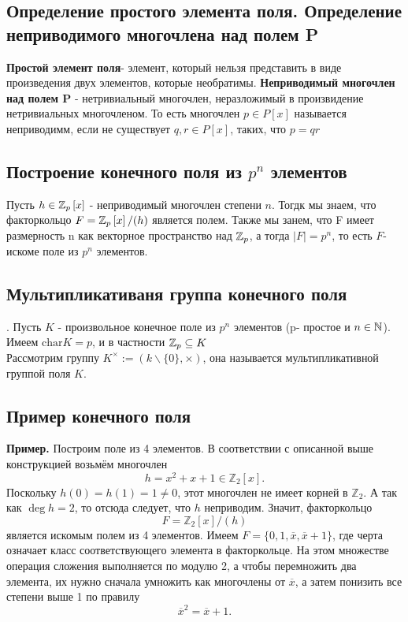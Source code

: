 \subsection{Определение простого элемента поля. Определение неприводимого многочлена над полем P}
\textbf{Простой элемент поля}- элемент, который  нельзя представить в виде произведения двух элементов, которые необратимы.
\textbf{Неприводимый многочлен над полем P} - нетривиальный многочлен, неразложимый в произвидение нетривиальных многочленом. То есть многочлен $p\in P\left[x\right]$ называется неприводимм, если не существует $q,r\in P\left[x\right]$, таких, что $p=qr$
\subsection{Построение конечного поля из $p^n$ элементов}
Пусть $h\in\mathbb{Z}_p\left[x\right]$ - неприводимый многочлен степени $n$. Тогдк мы знаем, что факторкольцо $F = \mathbb{Z}_p\left[x\right]/(h)$ является полем. Также мы занем, что F имеет размерность n как векторное пространство над $\mathbb{Z}_p$, а тогда $|F| = p^n$, то есть $F$- искоме поле из $p^n$ элементов. 
\subsection{Мультипликативаня группа конечного поля}.
Пусть $K$ - произвольное конечное поле из $p^n$ элементов (p- простое и $n\in\mathbb{N}$). Имеем $\text{char} K = p$, и в частности $\mathbb{Z}_p\subseteq K$\\
Рассмотрим группу $K^{\times} := (k\backslash\{0\}, \times)$, она называется мультипликативной группой поля $K$.
\subsection{Пример конечного поля}
\textbf{Пример.} Построим поле из 4 элементов. В соответствии с описанной выше конструкцией возьмём многочлен 
\[
h = x^2 + x + 1 \in \mathbb{Z}_2[x].
\]
Поскольку \( h(0) = h(1) = 1 \neq 0 \), этот многочлен не имеет корней в \(\mathbb{Z}_2\). А так как \(\deg h = 2\), то отсюда следует, что \( h \) неприводим. Значит, факторкольцо 
\[
F = \mathbb{Z}_2[x]/(h)
\]
является искомым полем из 4 элементов. Имеем \( F = \{0, 1, \overline{x}, \overline{x} + 1\} \), где черта означает класс соответствующего элемента в факторкольце. На этом множестве операция сложения выполняется по модулю 2, а чтобы перемножить два элемента, их нужно сначала умножить как многочлены от \(\overline{x}\), а затем понизить все степени выше 1 по правилу 
\[
\overline{x}^2 = \overline{x} + 1.
\]
